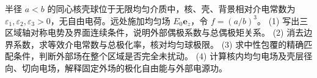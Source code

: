 半径 \(a<b\) 的同心核壳球位于无限均匀介质中，核、壳、背景相对介电常数为 \(\varepsilon_1,\varepsilon_2,\varepsilon_3>0\)，无自由电荷。远处施加均匀场 \(E_0\boldsymbol e_z\)，令 \(f=(a/b)^3\)。
(1) 写出三区域轴对称电势及界面连续条件，说明外部偶极系数与总偶极矩关系。
(2) 消去边界系数，求等效介电常数与总极化率，核对均匀球极限。
(3) 求中性包覆的精确匹配条件，判断外部场在整个区域是否完全未扰动。
(4) 计算核内均匀电场及壳层径向、切向电场，解释固定外场的极化自由能与外部电源功。
